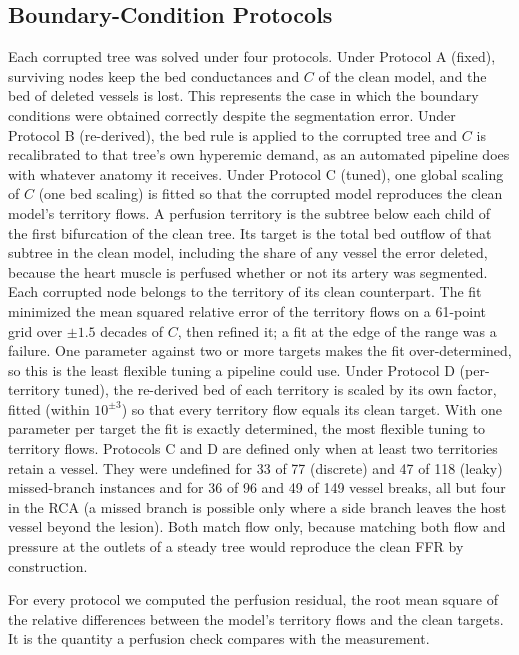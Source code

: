 \documentclass[journal]{IEEEtran}
\begin{document}
\subsection{Boundary-Condition Protocols}
Each corrupted tree was solved under four protocols. Under Protocol A (fixed), surviving
nodes keep the bed conductances and $C$ of the clean model, and the bed of deleted vessels is lost. This represents
the case in which the boundary conditions were obtained correctly despite the segmentation error. Under Protocol B
(re-derived), the bed rule is applied to the corrupted tree and $C$ is recalibrated to that tree's own hyperemic
demand, as an automated pipeline does with whatever anatomy it receives. Under Protocol C (tuned), one global
scaling of $C$ (one bed scaling) is fitted so that the corrupted model reproduces the clean model's territory
flows. A perfusion territory is the subtree below each child of
the first bifurcation of the clean tree. Its target is the total bed outflow of that subtree in the clean model,
including the share of any vessel the error deleted, because the heart muscle is perfused whether or not its artery
was segmented. Each corrupted node belongs to the territory of its clean counterpart. The fit minimized the mean squared relative error of the territory flows on a 61-point grid over $\pm 1.5$ decades
of $C$, then refined it; a fit at the edge of the range was a failure.
One parameter against two or more targets makes the fit over-determined, so this is the least flexible tuning a
pipeline could use. Under Protocol D (per-territory tuned), the re-derived bed of each territory is scaled by its
own factor, fitted (within $10^{\pm 3}$) so that every territory flow equals its clean target. With one parameter per target the fit is
exactly determined, the most flexible tuning to territory flows. Protocols C and D are defined only when at least two territories retain a vessel. They were undefined for 33 of
77 (discrete) and 47 of 118 (leaky) missed-branch instances and for 36 of 96 and 49 of 149 vessel breaks, all but
four in the RCA (a missed branch is possible only where a side branch leaves the host vessel beyond the lesion). Both match
flow only, because matching both flow and pressure at the outlets of a steady tree would reproduce the clean FFR by
construction.

For every protocol we computed the perfusion residual, the root mean square of the relative differences between the
model's territory flows and the clean targets. It is the quantity a perfusion check compares with the measurement.
\end{document}
